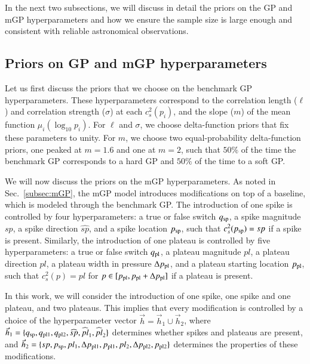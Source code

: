 \documentclass[aps,prd,nofootinbib,tightenlines,notitlepage,floatfix,superscriptaddress,showkeys,twocolumn]{revtex4-1}
\begin{document}
In the next two subsections, we will discuss in detail the priors on the GP and mGP hyperparameters and how we ensure the sample size is large enough and consistent with reliable astronomical observations. 


\subsection{Priors on GP and mGP hyperparameters}
Let us first discuss the priors that we choose on the benchmark GP hyperparameters. 
These hyperparameters correspond to the correlation length ($\ell$) and correlation strength ($\sigma$) at each $c_s^2(p_i)$, and the slope ($m$) of the mean function $\mu_i(\log_{10} p_i)$. For $\ell$ and $\sigma$, we choose delta-function priors that  fix these parameters to unity. For $m$, we choose two equal-probability delta-function priors, one peaked at $m=1.6$ and one at $m=2$, such that $50\%$ of the time the benchmark GP corresponds to a hard GP and $50\%$ of the time to a soft GP. 

We will now discuss the priors on the mGP hyperparameters. As noted in Sec.~\ref{subsec:mGP}, the mGP model introduces modifications on top of a baseline, which is modeled through the benchmark GP. The introduction of one spike is controlled by four hyperparameters: a true or false switch $q_{\rm sp}$, a spike magnitude $sp$, a spike direction $\widehat{sp}$, and a spike location $p_{\rm sp}$, such that $c_s^2(p_{\rm sp}) = sp$ if a spike is present. Similarly, the introduction of one plateau is controlled by five hyperparameters: a true or false switch $q_{\rm pl}$, a plateau magnitude $pl$, a plateau direction $\widehat{pl}$, a plateau width in pressure $\Delta p_{\rm pl}$, and a plateau starting location $p_{\rm pl}$, such that $c_s^2(p) = pl$ for $p \in [p_{\rm pl}, p_{\rm pl} + \Delta p_{\rm pl}]$ if a plateau is present.

In this work, we will consider the introduction of one spike, one spike and one plateau, and two plateaus. This implies that every modification is controlled by a choice of the hyperparameter vector $\vec{h} = \vec{h}_1 \cup \vec{h}_2$, where $\vec{h}_1 = \{q_{\rm sp}, q_{\rm pl 1}, q_{\rm pl 2}, \widehat{sp}, \widehat{pl}_1,\widehat{pl}_2\}$ determines whether spikes and plateaus are present, and $\vec{h}_2 = \{sp, p_{\rm sp}, pl_1, \Delta p_{\rm pl1}, p_{\rm pl1}, pl_2, \Delta p_{\rm pl2}, p_{\rm pl2} \}$ determines the properties of these modifications.
\end{document}
